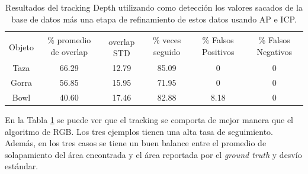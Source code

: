 \begin{table}[h]
    \begin{tabular}{|c|c|c|c|c|c|}
    \hline
    & \multirow{2}{2.4cm}{\% promedio de overlap} & & \multirow{2}{2cm}{\% veces seguido} & \multirow{2}{1.6cm}{\% Falsos Positivos} & \multirow{2}{1.6cm}{\% Falsos Negativos}\\
	Objeto & & overlap STD & & &\\
    \hline
    Taza   & 66.29      & 12.79       & 85.09             & 0                & 0\\
    \hline
    Gorra  & 56.85      & 15.95       & 71.95             & 0                & 0\\
    \hline
    Bowl   & 40.60      & 17.46       & 82.88             & 8.18             & 0\\
    \hline
    \end{tabular}
\caption{Resultados del tracking Depth utilizando como detección los valores sacados de la base de datos más una etapa de refinamiento de estos datos usando AP e ICP.}
\label{tabla_d}
\end{table}

En la Tabla \ref{tabla_d} se puede ver que el tracking se comporta de mejor manera que el algoritmo de RGB. Los tres ejemplos tienen una alta tasa de seguimiento. Además, en los tres casos se tiene un buen balance entre el promedio de solapamiento del área encontrada y el área reportada por el \textit{ground truth} y desvío estándar.


